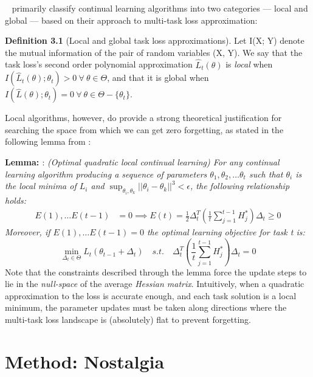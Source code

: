 ~\cite{lanzillotta2024local} primarily classify continual learning algorithms into two categories — local and global — based on their approach to multi-task loss approximation:

\noindent \textbf{Definition 3.1} (Local and global task loss approximations). Let I(X; Y) denote the mutual information of the pair of random variables (X, Y). We say that the task loss's second order polynomial approximation $\hat{L}_t(\theta)$ is \textit{local} when $I(\hat{L}_t(\theta); \theta_t) >0\ \forall\ \theta \in \Theta$, and that it is global when $I(\hat{L}(\theta);\theta_t) = 0\ \forall\ \theta\in \Theta - \{\theta_t\}$.

Local algorithms, however, do provide a strong theoretical justification for searching the space from which we can get zero forgetting, as stated in the following lemma from \cite{lanzillotta2024local}:

\noindent \textbf{Lemma: \cite{lanzillotta2024local}}: \textit{(Optimal quadratic local continual learning) For any continual learning algorithm producing a sequence of parameters $\theta_1, \theta_2, \ldots\theta_t$ such that $\theta_i$ is the local minima of $L_i$ and $\sup_{\theta_i,\theta_k} ||\theta_i - \theta_k||^3 < \epsilon$, the following relationship holds:}
\begin{align*}
    E(1),\ldots E(t-1) &= 0 \implies
    E(t) = \frac{1}{2}\Delta_t^T\left(\frac{1}{t} \sum_{j=1}^{t-1}H_j^* \right)\Delta_t
 \geq0\end{align*}
\textit{Moreover, if $E(1),\ldots E(t-1)=0$ the optimal learning objective for task t is:}
$$
\min_{\Delta_t \in \Theta} L_t(\theta_{t-1} + \Delta_t)\quad s.t.\quad \Delta_t^T\left(\frac{1}{t} \sum_{j=1}^{t-1}H_j^* \right)\Delta_t = 0
$$
Note that the constraints described through the lemma force the update steps to lie in the \textit{null-space} of the average \textit{Hessian matrix}. Intuitively, when a quadratic approximation to the loss is accurate enough, and each task solution is a local minimum, the parameter updates must be taken along directions where the multi-task loss landscape is (absolutely) flat to prevent forgetting.



\section{Method: Nostalgia}
\label{sec:nostalgia}

